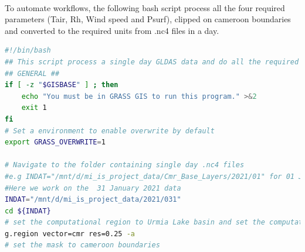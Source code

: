 \paragraph{}
To automate workflows, the following bash script process all the four required parameters (Tair, Rh, Wind speed and Psurf), clipped on cameroon boundaries  and converted to the required units from .nc4 files in a day.
\begin{lstlisting}[language=Bash]
#!/bin/bash
## This script process a single day GLDAS data and do all the required conversions needed for our project.
## GENERAL ##
if [ -z "$GISBASE" ] ; then
    echo "You must be in GRASS GIS to run this program." >&2
    exit 1
fi
# Set a environment to enable overwrite by default
export GRASS_OVERWRITE=1

# Navigate to the folder containing single day .nc4 files
#e.g INDAT="/mnt/d/mi_is_project_data/Cmr_Base_Layers/2021/01" for 01 January 2021
#Here we work on the  31 January 2021 data
INDAT="/mnt/d/mi_is_project_data/2021/031" 
cd ${INDAT}
# set the computational region to Urmia Lake basin and set the computational resolution to 0.25 degrees
g.region vector=cmr res=0.25 -a
# set the mask to cameroon boundaries


\end{lstlisting}
